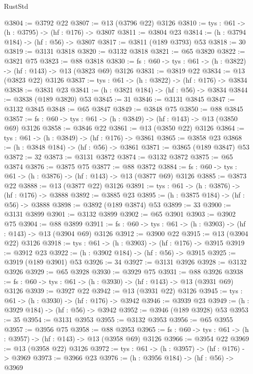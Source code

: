 \begin{lexlean}{RustStd}
\begin{coremodule}
{\begin{coremodule}
{{{{{{{{{{{{@3804 := @3792 @22
@3807 := @13 (@3796 @22) @3126
@3810 := {tys : @61} -> (h : @3795) -> (hf : @176) -> @3807
@3811 := @3804 @23
@3814 := (h : @3794 @184) -> (hf : @56) -> @3807
@3817 := @3811 (@189 @3793) @53
@3818 := 30
@3819 := @3131 @3818
@3820 := @3132 @3818
@3821 := @65 @3820
@3822 := @3821 @75
@3823 := @88 @3818
@3830 := {fs : @60} -> {tys : @61} -> (h : @3822) -> (hf : @143) -> @13 (@3823 @69) @3126
@3831 := @3819 @22
@3834 := @13 (@3823 @22) @3126
@3837 := {tys : @61} -> (h : @3822) -> (hf : @176) -> @3834
@3838 := @3831 @23
@3841 := (h : @3821 @184) -> (hf : @56) -> @3834
@3844 := @3838 (@189 @3820) @53
@3845 := 31
@3846 := @3131 @3845
@3847 := @3132 @3845
@3848 := @65 @3847
@3849 := @3848 @75
@3850 := @88 @3845
@3857 := {fs : @60} -> {tys : @61} -> (h : @3849) -> (hf : @143) -> @13 (@3850 @69) @3126
@3858 := @3846 @22
@3861 := @13 (@3850 @22) @3126
@3864 := {tys : @61} -> (h : @3849) -> (hf : @176) -> @3861
@3865 := @3858 @23
@3868 := (h : @3848 @184) -> (hf : @56) -> @3861
@3871 := @3865 (@189 @3847) @53
@3872 := 32
@3873 := @3131 @3872
@3874 := @3132 @3872
@3875 := @65 @3874
@3876 := @3875 @75
@3877 := @88 @3872
@3884 := {fs : @60} -> {tys : @61} -> (h : @3876) -> (hf : @143) -> @13 (@3877 @69) @3126
@3885 := @3873 @22
@3888 := @13 (@3877 @22) @3126
@3891 := {tys : @61} -> (h : @3876) -> (hf : @176) -> @3888
@3892 := @3885 @23
@3895 := (h : @3875 @184) -> (hf : @56) -> @3888
@3898 := @3892 (@189 @3874) @53
@3899 := 33
@3900 := @3131 @3899
@3901 := @3132 @3899
@3902 := @65 @3901
@3903 := @3902 @75
@3904 := @88 @3899
@3911 := {fs : @60} -> {tys : @61} -> (h : @3903) -> (hf : @143) -> @13 (@3904 @69) @3126
@3912 := @3900 @22
@3915 := @13 (@3904 @22) @3126
@3918 := {tys : @61} -> (h : @3903) -> (hf : @176) -> @3915
@3919 := @3912 @23
@3922 := (h : @3902 @184) -> (hf : @56) -> @3915
@3925 := @3919 (@189 @3901) @53
@3926 := 34
@3927 := @3131 @3926
@3928 := @3132 @3926
@3929 := @65 @3928
@3930 := @3929 @75
@3931 := @88 @3926
@3938 := {fs : @60} -> {tys : @61} -> (h : @3930) -> (hf : @143) -> @13 (@3931 @69) @3126
@3939 := @3927 @22
@3942 := @13 (@3931 @22) @3126
@3945 := {tys : @61} -> (h : @3930) -> (hf : @176) -> @3942
@3946 := @3939 @23
@3949 := (h : @3929 @184) -> (hf : @56) -> @3942
@3952 := @3946 (@189 @3928) @53
@3953 := 35
@3954 := @3131 @3953
@3955 := @3132 @3953
@3956 := @65 @3955
@3957 := @3956 @75
@3958 := @88 @3953
@3965 := {fs : @60} -> {tys : @61} -> (h : @3957) -> (hf : @143) -> @13 (@3958 @69) @3126
@3966 := @3954 @22
@3969 := @13 (@3958 @22) @3126
@3972 := {tys : @61} -> (h : @3957) -> (hf : @176) -> @3969
@3973 := @3966 @23
@3976 := (h : @3956 @184) -> (hf : @56) -> @3969
}}}}}}}}}}}}
\end{coremodule}}
\end{coremodule}
\end{lexlean}
